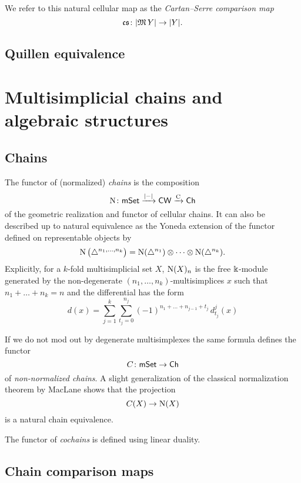 
We refer to this natural cellular map as the \textit{Cartan--Serre comparison map}
\[
\operatorname{\mathfrak{cs}} \colon \lvert\operatorname{\mathfrak{M}} Y\rvert \to \lvert Y\rvert.
\]

\subsection{Quillen equivalence}


\section{Multisimplicial chains and algebraic structures}

\subsection{Chains}

The functor of (normalized) \textit{chains} is the composition
\[
\operatorname{N} \colon \mathsf{mSet} \xrightarrow{\lvert-\rvert} \mathsf{CW} \xrightarrow{\operatorname{C}} \mathsf{Ch}
\]
of the geometric realization and functor of cellular chains.
It can also be described up to natural equivalence as the Yoneda extension of the functor defined on representable objects by
\[
\operatorname{N} \big( \triangle^{n_1, \dots, n_k} \big) =
\operatorname{N}(\triangle^{n_1}) \otimes \dotsb \otimes \operatorname{N}(\triangle^{n_k}).
\]
Explicitly, for a $k$-fold multisimplicial set $X$, $\operatorname{N}(X)_n$ is the free $\Bbbk$-module generated by the non-degenerate $(n_1, \dots, n_k)$-multisimplices $x$ such that $n_1 + \dots + n_k = n$ and the differential has the form 
\[
d(x) = \sum_{j=1}^k \sum_{t_j=0}^{n_j}
(-1)^{n_{1}+\dots+n_{j-1}+t_j} \, d^j_{t_j}(x)
\]

If we do not mod out by degenerate multisimplexes the same formula defines the functor
\[
C \colon \mathsf{mSet} \to \mathsf{Ch}
\]
of \textit{non-normalized chains}.
A slight generalization of the classical normalization theorem by MacLane \cite{MacLane} shows that the projection
\[
C(X) \to \operatorname{N}(X)
\]
is a natural chain equivalence.

The functor of \textit{cochains} is defined using linear duality.

\subsection{Chain comparison maps} \label{ss:comparison chain maps}

